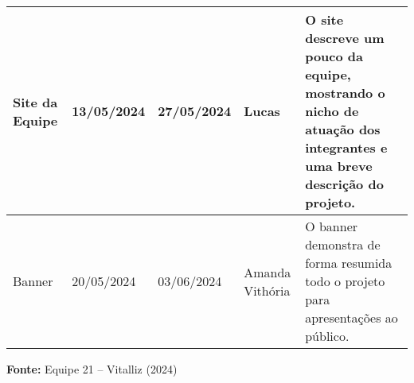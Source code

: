 \begin{center}
\begin{adjustbox}{max width=\textwidth}
\begin{tabular}{|m{4cm}|m{2.5cm}|m{2.5cm}|m{3cm}|m{8cm}|}
Site da Equipe & 13/05/2024 & 27/05/2024 & Lucas &
O site descreve um pouco da equipe, mostrando o nicho de atuação dos integrantes e uma breve descrição do projeto. \\ \hline

Banner & 20/05/2024 & 03/06/2024 & Amanda Vithória &
O banner demonstra de forma resumida todo o projeto para apresentações ao público. \\ \hline

\end{tabular}
\end{adjustbox}

\vspace{0.3em}
\small{\textbf{Fonte:} Equipe 21 – Vitalliz (2024)}

\end{center}
\medskip

